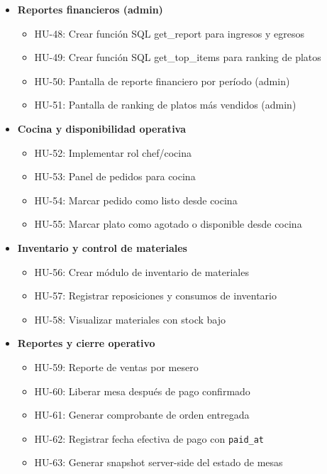 \begin{itemize}[leftmargin=1.5em]
\item \textbf{Reportes financieros (admin)}

\begin{itemize}
\item HU-48: Crear función SQL get\_report para ingresos y egresos
\item HU-49: Crear función SQL get\_top\_items para ranking de platos
\item HU-50: Pantalla de reporte financiero por período (admin)
\item HU-51: Pantalla de ranking de platos más vendidos (admin)
\end{itemize}

\item \textbf{Cocina y disponibilidad operativa}

\begin{itemize}
\item HU-52: Implementar rol chef/cocina
\item HU-53: Panel de pedidos para cocina
\item HU-54: Marcar pedido como listo desde cocina
\item HU-55: Marcar plato como agotado o disponible desde cocina
\end{itemize}

\item \textbf{Inventario y control de materiales}

\begin{itemize}
\item HU-56: Crear módulo de inventario de materiales
\item HU-57: Registrar reposiciones y consumos de inventario
\item HU-58: Visualizar materiales con stock bajo
\end{itemize}

\item \textbf{Reportes y cierre operativo}

\begin{itemize}
\item HU-59: Reporte de ventas por mesero
\item HU-60: Liberar mesa después de pago confirmado
\item HU-61: Generar comprobante de orden entregada
\item HU-62: Registrar fecha efectiva de pago con \texttt{paid\_at}
\item HU-63: Generar snapshot server-side del estado de mesas
\end{itemize}

\end{itemize}

